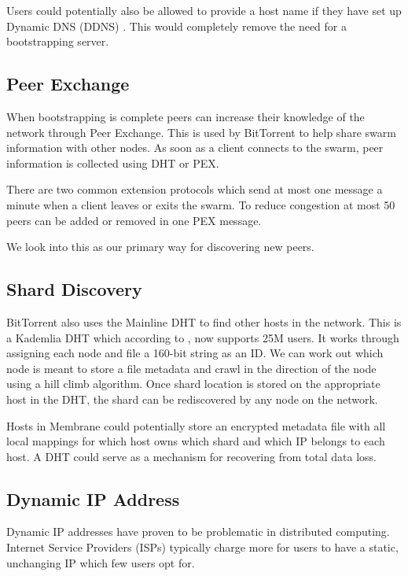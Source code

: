 \documentclass[11pt, a4paper, twoside]{report}
\begin{document}
Users could potentially also be allowed to provide a host name if they have set up Dynamic DNS (DDNS) \citep{bound1997dynamic}. This would completely remove the need for a bootstrapping server.

\subsection{Peer Exchange} \label{sec:pex}

When bootstrapping is complete peers can increase their knowledge of the network through Peer Exchange. This is used by BitTorrent to help share swarm information with other nodes. As soon as a client connects to the swarm, peer information is collected using DHT or PEX.

There are two common extension protocols which send at most one message a minute when a client leaves or exits the swarm. To reduce congestion at most 50 peers can be added or removed in one PEX message. \citep{vuze2010vuze}

We look into this as our primary way for discovering new peers.

\subsection{Shard Discovery} \label{sec:shard-discovery}

BitTorrent also uses the Mainline DHT to find other hosts in the network. This is a Kademlia DHT which according to \cite{jones2015mainlinedht}, now supports 25M users. It works through assigning each node and file a 160-bit string as an ID. We can work out which node is meant to store a file metadata and crawl in the direction of the node using a hill climb algorithm. Once shard location is stored on the appropriate host in the DHT, the shard can be rediscovered by any node on the network.

Hosts in Membrane could potentially store an encrypted metadata file with all local mappings for which host owns which shard and which IP belongs to each host. A DHT could serve as a mechanism for recovering from total data loss.

\subsection{Dynamic IP Address}

Dynamic IP addresses have proven to be problematic in distributed computing. Internet Service Providers (ISPs) typically charge more for users to have a static, unchanging IP which few users opt for.
\end{document}
